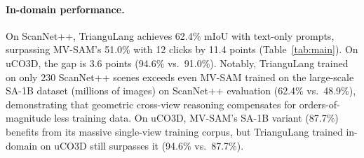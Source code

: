 \begin{table}[t]
\caption{In-domain, cross-dataset, and large-scale evaluation results. MV-SAM numbers from~\cite{mvsam}. TrianguLang uses text-only prompts; MV-SAM uses 12 click prompts per object. SA-1B denotes MV-SAM trained on single-view SA-1B data (millions of images).}
\label{tab:main}
\begin{center}
\end{center}
\end{table}

\paragraph{In-domain performance.}
On ScanNet++, TrianguLang achieves 62.4\% mIoU with text-only prompts, surpassing MV-SAM's 51.0\% with 12 clicks by 11.4 points (Table~\ref{tab:main}). On uCO3D, the gap is 3.6 points (94.6\% vs.\ 91.0\%). Notably, TrianguLang trained on only 230 ScanNet++ scenes exceeds even MV-SAM trained on the large-scale SA-1B dataset (millions of images) on ScanNet++ evaluation (62.4\% vs.\ 48.9\%), demonstrating that geometric cross-view reasoning compensates for orders-of-magnitude less training data. On uCO3D, MV-SAM's SA-1B variant (87.7\%) benefits from its massive single-view training corpus, but TrianguLang trained in-domain on uCO3D still surpasses it (94.6\% vs.\ 87.7\%).

